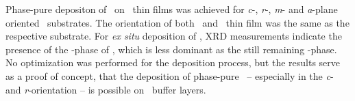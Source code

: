 Phase-pure depositon of \agao\ on \cro\ thin films was achieved for \textit{c}-, \textit{r}-, \textit{m}- and \textit{a}-plane oriented \alo\ substrates.
The orientation of both \cro\ and \agao\ thin film was the same as the respective substrate.
For \textit{ex situ} deposition of \gao, \gls{XRD} measurements indicate the presence of the \textbeta-phase of \gao, which is less dominant as the still remaining \textalpha-phase.
No optimization was performed for the deposition process, but the results serve as a proof of concept, that the deposition of phase-pure \agao\ -- especially in the \textit{c}- and \textit{r}-orientation -- is possible on \cro\ buffer layers.